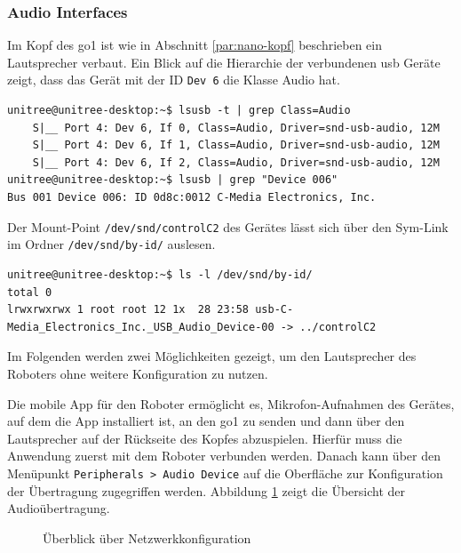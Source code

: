 \subsubsection{Audio Interfaces}
\label{subsubsec:audio-interfaces}

Im Kopf des \gls{go1} ist wie in Abschnitt \ref{par:nano-kopf} beschrieben ein Lautsprecher verbaut.
Ein Blick auf die Hierarchie der verbundenen \gls{usb} Geräte zeigt, dass das Gerät mit der ID \texttt{Dev \num{6}}
die Klasse Audio hat.

\begin{lstlisting}
unitree@unitree-desktop:~$ lsusb -t | grep Class=Audio
    S|__ Port 4: Dev 6, If 0, Class=Audio, Driver=snd-usb-audio, 12M
    S|__ Port 4: Dev 6, If 1, Class=Audio, Driver=snd-usb-audio, 12M
    S|__ Port 4: Dev 6, If 2, Class=Audio, Driver=snd-usb-audio, 12M
unitree@unitree-desktop:~$ lsusb | grep "Device 006"
Bus 001 Device 006: ID 0d8c:0012 C-Media Electronics, Inc.
\end{lstlisting}

\noindent Der Mount-Point \texttt{/dev/\allowbreak snd/\allowbreak controlC2} des Gerätes lässt sich über den Sym-Link
im Ordner \texttt{/dev/\allowbreak snd/\allowbreak by-id/} auslesen.

\begin{lstlisting}
unitree@unitree-desktop:~$ ls -l /dev/snd/by-id/
total 0
lrwxrwxrwx 1 root root 12 1x  28 23:58 usb-C-Media_Electronics_Inc._USB_Audio_Device-00 -> ../controlC2
\end{lstlisting}

\noindent Im Folgenden werden zwei Möglichkeiten gezeigt, um den Lautsprecher des Roboters ohne weitere Konfiguration zu nutzen.


Die mobile App für den Roboter ermöglicht es, Mikrofon-Aufnahmen des Gerätes, auf dem die App installiert ist, an den
\gls{go1} zu senden und dann über den Lautsprecher auf der Rückseite des Kopfes abzuspielen.
Hierfür muss die Anwendung zuerst mit dem Roboter verbunden werden.
Danach kann über den Menüpunkt \texttt{Peripherals > Audio Device} auf die Oberfläche zur Konfiguration der Übertragung
zugegriffen werden.
Abbildung \ref{fig:app-audio} zeigt die Übersicht der Audioübertragung.

\begin{figure}[h]
    \caption{Überblick über Netzwerkkonfiguration}\label{fig:app-audio}
\end{figure}

